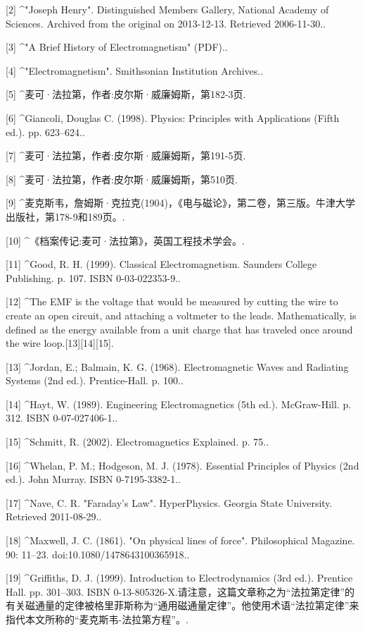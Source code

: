 [2]
^"Joseph Henry". Distinguished Members Gallery, National Academy of Sciences. Archived from the original on 2013-12-13. Retrieved 2006-11-30..

[3]
^"A Brief History of Electromagnetism" (PDF)..

[4]
^"Electromagnetism". Smithsonian Institution Archives..

[5]
^麦可·法拉第，作者:皮尔斯·威廉姆斯，第182-3页.

[6]
^Giancoli, Douglas C. (1998). Physics: Principles with Applications (Fifth ed.). pp. 623–624..

[7]
^麦可·法拉第，作者:皮尔斯·威廉姆斯，第191-5页.

[8]
^麦可·法拉第，作者:皮尔斯·威廉姆斯，第510页.

[9]
^麦克斯韦，詹姆斯·克拉克(1904)，《电与磁论》，第二卷，第三版。牛津大学出版社，第178-9和189页。.

[10]
^《档案传记:麦可·法拉第》，英国工程技术学会。.

[11]
^Good, R. H. (1999). Classical Electromagnetism. Saunders College Publishing. p. 107. ISBN 0-03-022353-9..

[12]
^The EMF is the voltage that would be measured by cutting the wire to create an open circuit, and attaching a voltmeter to the leads. Mathematically, is defined as the energy available from a unit charge that has traveled once around the wire loop.[13][14][15].

[13]
^Jordan, E.; Balmain, K. G. (1968). Electromagnetic Waves and Radiating Systems (2nd ed.). Prentice-Hall. p. 100..

[14]
^Hayt, W. (1989). Engineering Electromagnetics (5th ed.). McGraw-Hill. p. 312. ISBN 0-07-027406-1..

[15]
^Schmitt, R. (2002). Electromagnetics Explained. p. 75..

[16]
^Whelan, P. M.; Hodgeson, M. J. (1978). Essential Principles of Physics (2nd ed.). John Murray. ISBN 0-7195-3382-1..

[17]
^Nave, C. R. "Faraday's Law". HyperPhysics. Georgia State University. Retrieved 2011-08-29..

[18]
^Maxwell, J. C. (1861). "On physical lines of force". Philosophical Magazine. 90: 11–23. doi:10.1080/1478643100365918..

[19]
^Griffiths, D. J. (1999). Introduction to Electrodynamics (3rd ed.). Prentice Hall. pp. 301–303. ISBN 0-13-805326-X.请注意，这篇文章称之为“法拉第定律”的有关磁通量的定律被格里菲斯称为“通用磁通量定律”。他使用术语“法拉第定律”来指代本文所称的“麦克斯韦-法拉第方程”。.

